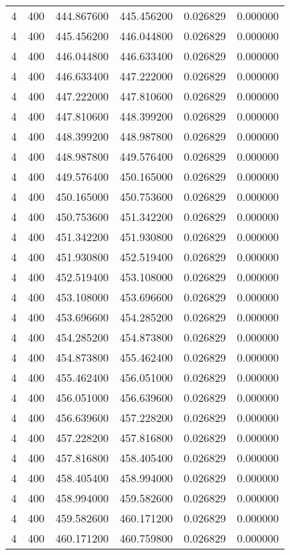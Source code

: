 \begin{longtable}{rrrrrr}
4 & 400 & 444.867600 & 445.456200 & 0.026829 & 0.000000 \\
4 & 400 & 445.456200 & 446.044800 & 0.026829 & 0.000000 \\
4 & 400 & 446.044800 & 446.633400 & 0.026829 & 0.000000 \\
4 & 400 & 446.633400 & 447.222000 & 0.026829 & 0.000000 \\
4 & 400 & 447.222000 & 447.810600 & 0.026829 & 0.000000 \\
4 & 400 & 447.810600 & 448.399200 & 0.026829 & 0.000000 \\
4 & 400 & 448.399200 & 448.987800 & 0.026829 & 0.000000 \\
4 & 400 & 448.987800 & 449.576400 & 0.026829 & 0.000000 \\
4 & 400 & 449.576400 & 450.165000 & 0.026829 & 0.000000 \\
4 & 400 & 450.165000 & 450.753600 & 0.026829 & 0.000000 \\
4 & 400 & 450.753600 & 451.342200 & 0.026829 & 0.000000 \\
4 & 400 & 451.342200 & 451.930800 & 0.026829 & 0.000000 \\
4 & 400 & 451.930800 & 452.519400 & 0.026829 & 0.000000 \\
4 & 400 & 452.519400 & 453.108000 & 0.026829 & 0.000000 \\
4 & 400 & 453.108000 & 453.696600 & 0.026829 & 0.000000 \\
4 & 400 & 453.696600 & 454.285200 & 0.026829 & 0.000000 \\
4 & 400 & 454.285200 & 454.873800 & 0.026829 & 0.000000 \\
4 & 400 & 454.873800 & 455.462400 & 0.026829 & 0.000000 \\
4 & 400 & 455.462400 & 456.051000 & 0.026829 & 0.000000 \\
4 & 400 & 456.051000 & 456.639600 & 0.026829 & 0.000000 \\
4 & 400 & 456.639600 & 457.228200 & 0.026829 & 0.000000 \\
4 & 400 & 457.228200 & 457.816800 & 0.026829 & 0.000000 \\
4 & 400 & 457.816800 & 458.405400 & 0.026829 & 0.000000 \\
4 & 400 & 458.405400 & 458.994000 & 0.026829 & 0.000000 \\
4 & 400 & 458.994000 & 459.582600 & 0.026829 & 0.000000 \\
4 & 400 & 459.582600 & 460.171200 & 0.026829 & 0.000000 \\
4 & 400 & 460.171200 & 460.759800 & 0.026829 & 0.000000 \\

\end{longtable}

